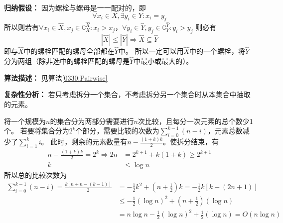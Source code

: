 \begin{questions}
\begin{solution}
        \textbf{归纳假设：}
        因为螺栓与螺母是一一配对的，即\[ \forall x_i \in X, \exists y_i \in Y : x_i = y_j \]
        所以则若有$
            \forall x_i \in \hat{X}, x_j \in \complement_X^{\hat{X}} : x_i > x_j
        $，$
            \forall y_i \in \hat{Y}, y_j \in \complement_Y^{\hat{Y}} : y_i > y_j
        $
        则必有\[
            \left| \hat{X} \right| \le \left| \hat{Y} \right| \Rightarrow \hat{X} \subseteq \hat{Y}
        \]
        即与$\hat{X}$中的螺栓匹配的螺母全部都在$\hat{Y}$中。
        所以一定可以用$\hat{X}$中的一个螺栓，将$\hat{Y}$分为两组（除非选中的螺栓匹配的螺母是$\hat{Y}$中最小或最大的）。

        \textbf{算法描述：}
        见算法\ref{0330:Pairwise}

        \textbf{复杂性分析：}
        若只考虑拆分一个集合，不考虑拆分另一个集合时从本集合中抽取的元素。

        将一个规模为$n$的集合分为两部分需要进行$n$次比较，且每分一次元素的总个数少1个。
        若要将集合分为$2^k$个部分，需要比较的次数为$\sum_{i = 0}^{k-1} {(n-i)}$，元素总数减少了$\sum_{i=1}^k i$。
        此时，剩余的元素数量有$n - \frac{(1+k)k}{2}$。使拆分结束，有\begin{align*}
            n - \frac{(1+k)k}{2} = 2^k \Rightarrow
            2n & = 2^{k+1} + k(1+k) \ge 2^{k+1} \\
            k  & \le \log{n}
        \end{align*}
        所以总的比较次数为\begin{align*}
            \sum_{i = 0}^{k-1} {(n-i)} = \frac{k\left[n+n-(k-1)\right]}{2}
             & = - \frac{1}{2} k^2 + (n + \frac{1}{2}) k = - \frac{1}{2} k \left[ k - (2 n + 1) \right] \\
             & \le - \frac{1}{2} (\log n)^2 + (n + \frac{1}{2}) (\log n)                                \\
             & = n\log{n} - \frac{1}{2} (\log n)^2 + \frac{1}{2} (\log n) = O(n \log n)
        \end{align*}


\end{solution}
\end{questions}
